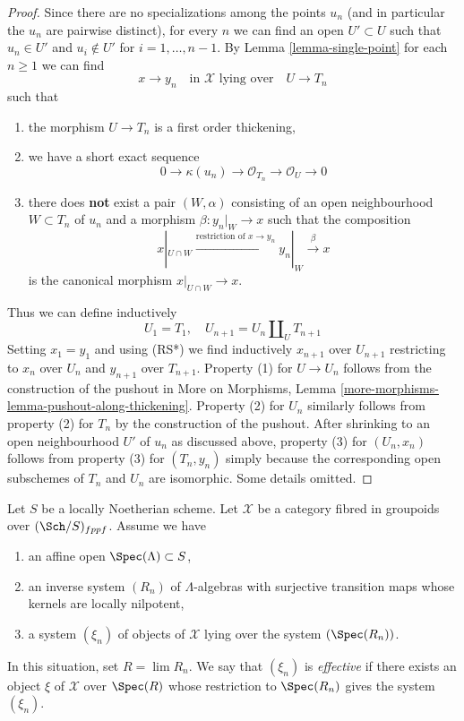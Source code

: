 \begin{proof}
Since there are no specializations among the points $u_n$ (and in
particular the $u_n$ are pairwise distinct), for every $n$
we can find an open $U' \subset U$
such that $u_n \in U'$ and $u_i \not \in U'$ for $i = 1, \ldots, n - 1$.
By Lemma \ref{lemma-single-point} for each $n \geq 1$ we can find
$$
x \to y_n
\quad\text{in }\mathcal{X}\text{ lying over}\quad
U \to T_n
$$
such that
\begin{enumerate}
\item the morphism $U \to T_n$ is a first order thickening,
\item we have a short exact sequence
$$
0 \to \kappa(u_n) \to \mathcal{O}_{T_n} \to \mathcal{O}_U \to 0
$$
\item there does {\bf not} exist a pair $(W, \alpha)$
consisting of an open neighbourhood $W \subset T_n$ of $u_n$
and a morphism $\beta : y_n|_W \to x$ such that the composition
$$
x|_{U \cap W} \xrightarrow{\text{restriction of }x \to y_n}
y_n|_W \xrightarrow{\beta} x
$$
is the canonical morphism $x|_{U \cap W} \to x$.
\end{enumerate}
Thus we can define inductively
$$
U_1 = T_1, \quad
U_{n + 1} = U_n \amalg_U T_{n + 1}
$$
Setting $x_1 = y_1$ and using (RS*) we find inductively
$x_{n + 1}$ over $U_{n + 1}$ restricting to
$x_n$ over $U_n$ and $y_{n + 1}$ over $T_{n + 1}$.
Property (1) for $U \to U_n$ follows from the construction
of the pushout in More on Morphisms, Lemma
\ref{more-morphisms-lemma-pushout-along-thickening}.
Property (2) for $U_n$ similarly follows from
property (2) for $T_n$ by the construction of the pushout.
After shrinking to an open neighbourhood $U'$ of $u_n$
as discussed above, property (3) for $(U_n, x_n)$ follows from property (3)
for $(T_n, y_n)$ simply because the corresponding open subschemes
of $T_n$ and $U_n$ are isomorphic. Some details omitted.
\end{proof}

\begin{remark}
\label{remark-strong-effectiveness}
Let $S$ be a locally Noetherian scheme.
Let $\mathcal{X}$ be a category fibred in groupoids over $(\Sch/S)_{fppf}$.
Assume we have
\begin{enumerate}
\item an affine open $\Spec(\Lambda) \subset S$,
\item an inverse system $(R_n)$ of $\Lambda$-algebras
with surjective transition maps whose kernels are locally nilpotent,
\item a system $(\xi_n)$ of objects of $\mathcal{X}$ lying
over the system $(\Spec(R_n))$.
\end{enumerate}
In this situation, set $R = \lim R_n$. We say that
$(\xi_n)$ is {\it effective} if there exists an object
$\xi$ of $\mathcal{X}$ over $\Spec(R)$ whose restriction
to $\Spec(R_n)$ gives the system $(\xi_n)$.
\end{remark}

